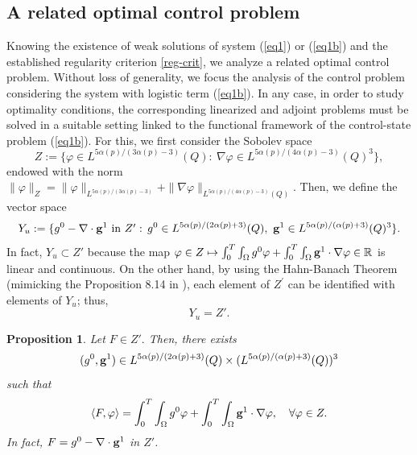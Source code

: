 \documentclass[11pt,reqno]{amsart}%
\newtheorem{proposition}[theorem]{Proposition}
\numberwithin{equation}{section}
\begin{document}
\subsection{A related optimal control problem}\label{section2.3}
Knowing the existence  of weak solutions of system (\ref{eq1}) or (\ref{eq1b}) and the established regularity criterion \eqref{reg-crit},  we analyze a related optimal control problem.  Without loss of generality, we focus the analysis of the control problem considering the system with logistic term (\ref{eq1b}).
In any case, in order to study optimality conditions, the corresponding  linearized and adjoint problems must be solved in a suitable setting linked to the functional framework of the control-state problem (\ref{eq1b}). 
For this, we first consider the Sobolev space
$$
Z:=\{\varphi\in L^{5\alpha(p)/(3\alpha(p)-3)}(Q):\ \nabla\varphi\in L^{5\alpha(p)/(4\alpha(p)-3)}(Q)^3\},
$$
endowed with the norm $\| \varphi  \|_Z=\| \varphi \|_{L^{5\alpha(p)/(3\alpha(p)-3)}}+ 
\| \nabla\varphi \|_{L^{5\alpha(p)/(4\alpha(p)-3)}(Q)}$. Then, we define 
the vector space
\begin{eqnarray*}
Y_u:=\{g^0-\nabla\cdot{\bf g}^1 \ \hbox{in $Z'$}:\, g^0\in L^{5\alpha(p)/(2\alpha(p)+3)}(Q),\ {\bf g}^1\in L^{5\alpha(p)/(\alpha(p)+3)}(Q)^3\}.
\end{eqnarray*} 
In fact, $Y_u\subset Z'$ because the map $\varphi\in Z \mapsto \int_0^T\int_\Omega g^0\varphi+\int_0^T\int_\Omega {\bf g}^1\cdot\nabla \varphi \in \mathbb{R}$ is linear and continuous.
  On the other hand, by using the Hahn-Banach Theorem (mimicking the Proposition 8.14 in \cite{Brezis}), each element of $Z^\prime$ can be identified with elements of  $Y_u$; thus, 
  $$Y_u=Z'.
  $$
\begin{proposition}\label{ident}
Let $F\in Z'.$ Then, there exists 
$$(g^0,{\bf g}^1)\in L^{5\alpha(p)/(2\alpha(p)+3)}(Q)\times (L^{5\alpha(p)/(\alpha(p)+3)}(Q))^3$$ such that
$$\langle F,\varphi\rangle=
\int_0^T\int_\Omega g^0\varphi+\int_0^T\int_\Omega {\bf g}^1\cdot\nabla \varphi,
\quad \forall\varphi\in Z.
$$
In fact, $F=g^0-\nabla\cdot {\bf g}^1$ in $Z'$.
\end{proposition}
%
\end{document}
